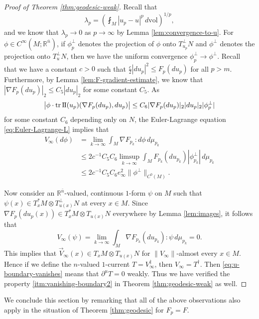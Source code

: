 \documentclass[a4paper]{article}
\newcommand{\R}{\mathbb{R}}
\newcommand{\vol}{\mathrm{vol}}
\newcommand{\ndim}{{\bar{n}}}
\newcommand{\sff}{\mathrm{I{\mkern -1mu}I}}
\DeclareMathOperator{\tr}{tr}
\theoremstyle{definition}
\theoremstyle{remark}
\begin{document}
\begin{proof}[Proof of Theorem \ref{thm:geodesic-weak}]
Recall that
\[
\lambda_p = \left(\fint_M |u_p - u|^p \, d\vol\right)^{1/p},
\]
and we know that $\lambda_p \to 0$ as $p \to \infty$ by Lemma \ref{lem:convergence-to-u}. For $\phi \in C^\infty(M; \R^\ndim)$, if $\phi_p^\perp$ denotes the projection of $\phi$
onto $T_{u_p}^\perp N$ and $\phi^\perp$ denotes the projection onto $T_u^\perp N$,
then we have the uniform convergence $\phi_p^\perp \to \phi^\perp$. Recall
that we have a constant $c > 0$ such that $\frac{c}{2} |du_p|^2 \le F_p(du_p)$ for all $p > m$.
Furthermore, by Lemma \ref{lem:F-gradient-estimate}, we know that $|\nabla F_p(du_p)|_2 \le C_5 |du_p|_2$ for some constant $C_5$. As
\[
\bigl|\phi \cdot \tr \sff(u_p)(\nabla F_p(du_p), du_p)\bigr| \le C_6 |\nabla F_p(du_p)|_2 |du_p|_2 |\phi_p^\perp|
\]
for some constant $C_6$ depending only on $N$, the Euler-Lagrange equation \eqref{eq:Euler-Lagrange-L} implies that
\begin{equation} \label{eq:u-boundary-vanishes}
\begin{split}
V_\infty(d\phi) & = \lim_{k \to \infty} \int_M \nabla F_{p_k} : d\phi \, d\mu_{p_k} \\
& \le 2c^{-1} C_5 C_6 \limsup_{k \to \infty} \int_M F_{p_k}(du_{p_k}) |\phi_{p_k}^\perp| \, d\mu_{p_k} \\
& \le 2c^{-1} C_5 C_6 e_\infty^2 \|\phi^\perp\|_{C^0(M)}.
\end{split}
\end{equation}

Now consider an $\R^\ndim$-valued, continuous $1$-form $\psi$ on $M$ such that $\psi(x) \in T_x^* M \otimes T_{u(x)}^\perp N$ at every $x \in M$. Since $\nabla F_p(du_p(x)) \in T_x^* M \otimes T_{u(x)} N$ everywhere by Lemma \ref {lem:images},
it follows that
\[
V_\infty(\psi) = \lim_{k \to \infty} \int_M \nabla F_{p_k}(du_{p_k}) : \psi \, d\mu_{p_k} = 0.
\]
This implies that $\vec{V}_\infty(x) \in T_x M \otimes T_{u(x)} N$ for $\|V_\infty\|$-almost every $x \in M$. Hence if we define the $n$-valued $1$-current $T = V^\ddagger_\infty$, then $V_\infty = T^\dagger$. 
Then \eqref{eq:u-boundary-vanishes} means that
$\partial^u T = 0$ weakly.
Thus we have verified the property \ref{itm:vanishing-boundary2} in Theorem \ref{thm:geodesic-weak} as well.
\end{proof}

We conclude this section by remarking that all of the above observations also apply
in the situation of Theorem \ref{thm:geodesic} for $F_p = F$.
\end{document}
